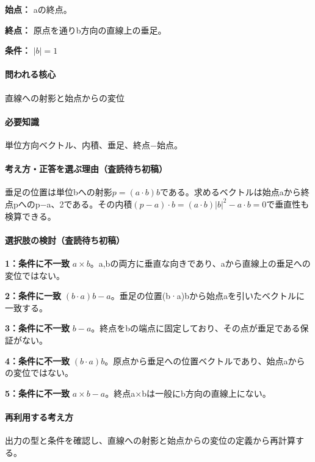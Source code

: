 \noindent\textbf{始点：} aの終点。\par

\noindent\textbf{終点：} 原点を通りb方向の直線上の垂足。\par

\noindent\textbf{条件：} \(|b|=1\)\par

\paragraph{問われる核心} 直線への射影と始点からの変位

\paragraph{必要知識} 単位方向ベクトル、内積、垂足、終点−始点。

\paragraph{考え方・正答を選ぶ理由（査読待ち初稿）} 垂足の位置は単位bへの射影\(p=(a\cdot b)b\)である。求めるベクトルは始点aから終点pへのp−a、2である。その内積\((p-a)\cdot b=(a\cdot b)|b|^2-a\cdot b=0\)で垂直性も検算できる。

\paragraph{選択肢の検討（査読待ち初稿）}\mbox{}\par

\noindent\textbf{1：条件に不一致} \(a\times b\)。a,bの両方に垂直な向きであり、aから直線上の垂足への変位ではない。\par

\noindent\textbf{2：条件に一致} \((b\cdot a)b-a\)。垂足の位置(b·a)bから始点aを引いたベクトルに一致する。\par

\noindent\textbf{3：条件に不一致} \(b-a\)。終点をbの端点に固定しており、その点が垂足である保証がない。\par

\noindent\textbf{4：条件に不一致} \((b\cdot a)b\)。原点から垂足への位置ベクトルであり、始点aからの変位ではない。\par

\noindent\textbf{5：条件に不一致} \(a\times b-a\)。終点a×bは一般にb方向の直線上にない。\par

\paragraph{再利用する考え方} 出力の型と条件を確認し、直線への射影と始点からの変位の定義から再計算する。

